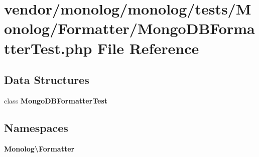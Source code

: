 \section{vendor/monolog/monolog/tests/\+Monolog/\+Formatter/\+Mongo\+D\+B\+Formatter\+Test.php File Reference}
\label{_mongo_d_b_formatter_test_8php}
\subsection*{Data Structures}
\begin{DoxyCompactItemize}
\item 
class {\bf Mongo\+D\+B\+Formatter\+Test}
\end{DoxyCompactItemize}
\subsection*{Namespaces}
\begin{DoxyCompactItemize}
\item 
 {\bf Monolog\textbackslash{}\+Formatter}
\end{DoxyCompactItemize}
